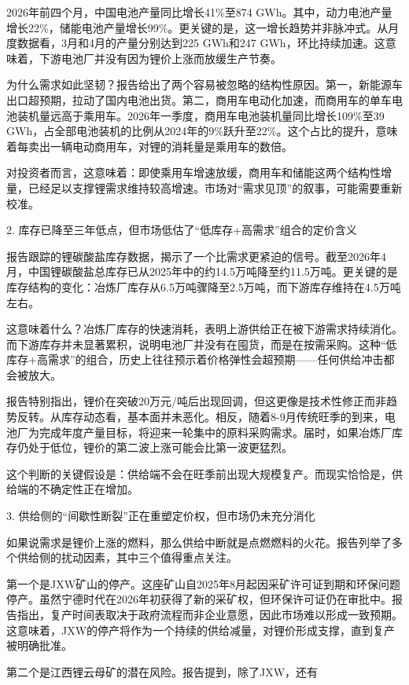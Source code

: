 \documentclass[11pt]{ctexart}
\begin{document}
2026年前四个月，中国电池产量同比增长41\%至874 GWh。其中，动力电池产量增长22\%，储能电池产量增长99\%。更关键的是，这一增长趋势并非脉冲式。从月度数据看，3月和4月的产量分别达到225 GWh和247 GWh，环比持续加速。这意味着，下游电池厂并没有因为锂价上涨而放缓生产节奏。

为什么需求如此坚韧？报告给出了两个容易被忽略的结构性原因。第一，新能源车出口超预期，拉动了国内电池出货。第二，商用车电动化加速，而商用车的单车电池装机量远高于乘用车。2026年一季度，商用车电池装机量同比增长109\%至39 GWh，占全部电池装机的比例从2024年的9\%跃升至22\%。这个占比的提升，意味着每卖出一辆电动商用车，对锂的消耗量是乘用车的数倍。

对投资者而言，这意味着：即使乘用车增速放缓，商用车和储能这两个结构性增量，已经足以支撑锂需求维持较高增速。市场对“需求见顶”的叙事，可能需要重新校准。

2. 库存已降至三年低点，但市场低估了“低库存+高需求”组合的定价含义

报告跟踪的锂碳酸盐库存数据，揭示了一个比需求更紧迫的信号。截至2026年4月，中国锂碳酸盐总库存已从2025年中的约14.5万吨降至约11.5万吨。更关键的是库存结构的变化：冶炼厂库存从6.5万吨骤降至2.5万吨，而下游库存维持在4.5万吨左右。

这意味着什么？冶炼厂库存的快速消耗，表明上游供给正在被下游需求持续消化。而下游库存并未显著累积，说明电池厂并没有在囤货，而是在按需采购。这种“低库存+高需求”的组合，历史上往往预示着价格弹性会超预期——任何供给冲击都会被放大。

报告特别指出，锂价在突破20万元/吨后出现回调，但这更像是技术性修正而非趋势反转。从库存动态看，基本面并未恶化。相反，随着8-9月传统旺季的到来，电池厂为完成年度产量目标，将迎来一轮集中的原料采购需求。届时，如果冶炼厂库存仍处于低位，锂价的第二波上涨可能会比第一波更猛烈。

这个判断的关键假设是：供给端不会在旺季前出现大规模复产。而现实恰恰是，供给端的不确定性正在增加。

3. 供给侧的“间歇性断裂”正在重塑定价权，但市场仍未充分消化

如果说需求是锂价上涨的燃料，那么供给中断就是点燃燃料的火花。报告列举了多个供给侧的扰动因素，其中三个值得重点关注。

第一个是JXW矿山的停产。这座矿山自2025年8月起因采矿许可证到期和环保问题停产。虽然宁德时代在2026年初获得了新的采矿权，但环保许可证仍在审批中。报告指出，复产时间表取决于政府流程而非企业意愿，因此市场难以形成一致预期。这意味着，JXW的停产将作为一个持续的供给减量，对锂价形成支撑，直到复产被明确批准。

第二个是江西锂云母矿的潜在风险。报告提到，除了JXW，还有
\end{document}
